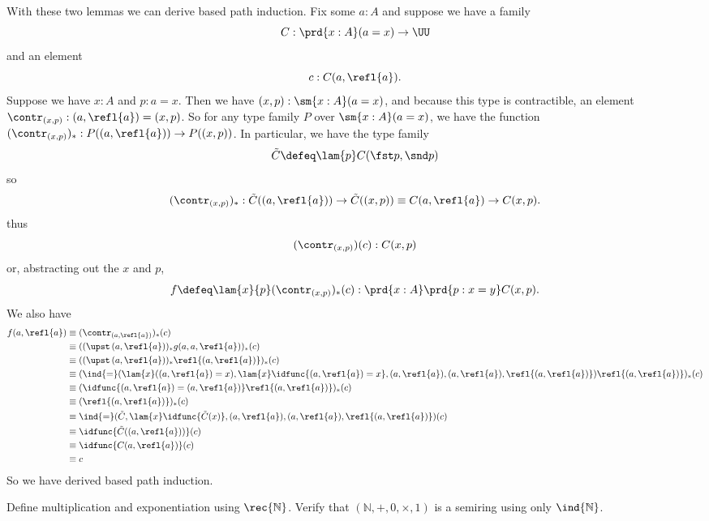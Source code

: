 With these two lemmas we can derive based path induction.  Fix some $a:A$ and
suppose we have a family
\[
  C : \prd{x:A} (a=x) \to \UU
\]
and an element
\[
  c : C(a, \refl{a}).
\]
Suppose we have $x:A$ and $p:a=x$.  Then we have $(x,p) : \sm{x:A}(a=x)$, and
because this type is contractible, an element $\contr_{(x,p)}: (a,\refl{a}) =
(x,p)$.  So for any type family $P$ over $\sm{x:A}(a=x)$, we have the function
$(\contr_{(x,p)})_{*} : P((a, \refl{a})) \to P((x,p))$.  In particular, we have
the type family
\[
\tilde{C} \defeq \lam{p} C(\fst p, \snd p)
\]
so
\[
  (\contr_{(x,p)})_{*} : \tilde{C}((a,\refl{a})) \to \tilde{C}((x,p)) \equiv  C(a, \refl{a}) \to C(x, p).
\]
thus
\[
(\contr_{(x,p)})(c) : C(x,p)
\]
or, abstracting out the $x$ and $p$,
\[
f \defeq \lam{x}{p}(\contr_{(x,p)})_{*}(c) : \prd{x:A}\prd{p:x=y}C(x,p).
\]
We also have
\begin{align*}
  f(a, \refl{a}) 
  & \equiv 
  (\contr_{(a, \refl{a})})_{*}(c)
  \\&\equiv
  ((\upst\, (a, \refl{a}))_{*}g(a, a, \refl{a}))_{*}(c)
  \\&\equiv
  ((\upst\, (a, \refl{a}))_{*}\refl{(a, \refl{a})})_{*}(c)
  \\&\equiv
  (\ind{=}(\lam{x}((a, \refl{a}) = x), \lam{x}\idfunc{(a, \refl{a})=x}, (a,\refl{a}), (a,\refl{a}),
  \refl{(a,\refl{a})})\refl{(a, \refl{a})})_{*}(c)
  \\&\equiv
  (\idfunc{(a, \refl{a})=(a,\refl{a})}\refl{(a, \refl{a})})_{*}(c)
  \\&\equiv
  (\refl{(a, \refl{a})})_{*}(c)
  \\&\equiv
  \ind{=}(\tilde{C}, \lam{x}\idfunc{\tilde{C}(x)}, (a, \refl{a}), (a, \refl{a}), \refl{(a, \refl{a})})(c)
  \\&\equiv
  \idfunc{\tilde{C}((a, \refl{a}))}(c)
  \\&\equiv
  \idfunc{C(a, \refl{a})}(c)
  \\&\equiv
  c
\end{align*}
So we have derived based path induction.


\begin{coqdoccode}
\coqdocemptyline
\end{coqdoccode}
Define multiplication and exponentiation using
$\rec{\mathbb{N}}$.  Verify that $(\mathbb{N}, +, 0, \times, 1)$ is a semiring
using only $\ind{\mathbb{N}}$.



